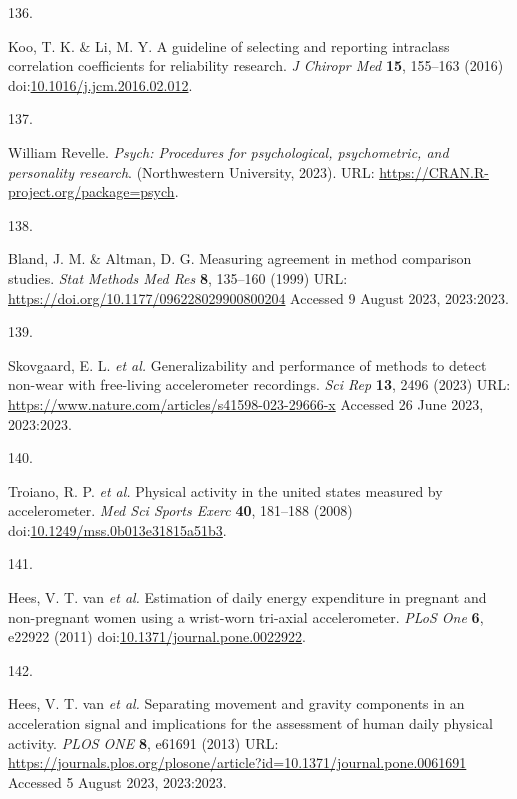 \documentclass[
  10pt,
]{scrbook}
\newlength{\cslhangindent}
\newlength{\csllabelwidth}
\newlength{\cslentryspacingunit} %
\newenvironment{CSLReferences}[2] %
 {%
  \setlength{\parindent}{0pt}
  \ifodd #1
  \let\oldpar\par
  \def\par{\hangindent=\cslhangindent\oldpar}
  \fi
  \setlength{\parskip}{#2\cslentryspacingunit}
 }%
 {}
\newcommand{\CSLLeftMargin}[1]{\parbox[t]{\csllabelwidth}{#1}}
\newcommand{\CSLRightInline}[1]{\parbox[t]{\linewidth - \csllabelwidth}{#1}\break}
\let\originaltextbf\textbf
\renewcommand{\textbf}[1]{\textcolor{color1}{\originaltextbf{#1}}}
\begin{document}
\begin{CSLReferences}{0}{0}
\leavevmode{}%
\CSLLeftMargin{136. }%
\CSLRightInline{Koo, T. K. \& Li, M. Y. A guideline of selecting and
reporting intraclass correlation coefficients for reliability research.
\emph{J Chiropr Med} \textbf{15}, 155--163 (2016)
doi:\href{https://doi.org/10.1016/j.jcm.2016.02.012}{10.1016/j.jcm.2016.02.012}.}

\leavevmode{}%
\CSLLeftMargin{137. }%
\CSLRightInline{William Revelle. \emph{Psych: Procedures for
psychological, psychometric, and personality research}. (Northwestern
University, 2023). URL: \url{https://CRAN.R-project.org/package=psych}.}

\leavevmode{}%
\CSLLeftMargin{138. }%
\CSLRightInline{Bland, J. M. \& Altman, D. G. Measuring agreement in
method comparison studies. \emph{Stat Methods Med Res} \textbf{8},
135--160 (1999) URL: \url{https://doi.org/10.1177/096228029900800204}
Accessed 9 August 2023, 2023:2023.}

\leavevmode{}%
\CSLLeftMargin{139. }%
\CSLRightInline{Skovgaard, E. L. \emph{et al.} Generalizability and
performance of methods to detect non-wear with free-living accelerometer
recordings. \emph{Sci Rep} \textbf{13}, 2496 (2023) URL:
\url{https://www.nature.com/articles/s41598-023-29666-x} Accessed 26
June 2023, 2023:2023.}

\leavevmode{}%
\CSLLeftMargin{140. }%
\CSLRightInline{Troiano, R. P. \emph{et al.} Physical activity in the
united states measured by accelerometer. \emph{Med Sci Sports Exerc}
\textbf{40}, 181--188 (2008)
doi:\href{https://doi.org/10.1249/mss.0b013e31815a51b3}{10.1249/mss.0b013e31815a51b3}.}

\leavevmode{}%
\CSLLeftMargin{141. }%
\CSLRightInline{Hees, V. T. van \emph{et al.} Estimation of daily energy
expenditure in pregnant and non-pregnant women using a wrist-worn
tri-axial accelerometer. \emph{{PLoS} One} \textbf{6}, e22922 (2011)
doi:\href{https://doi.org/10.1371/journal.pone.0022922}{10.1371/journal.pone.0022922}.}

\leavevmode{}%
\CSLLeftMargin{142. }%
\CSLRightInline{Hees, V. T. van \emph{et al.} Separating movement and
gravity components in an acceleration signal and implications for the
assessment of human daily physical activity. \emph{{PLOS} {ONE}}
\textbf{8}, e61691 (2013) URL:
\url{https://journals.plos.org/plosone/article?id=10.1371/journal.pone.0061691}
Accessed 5 August 2023, 2023:2023.}


\end{CSLReferences}
\end{document}
